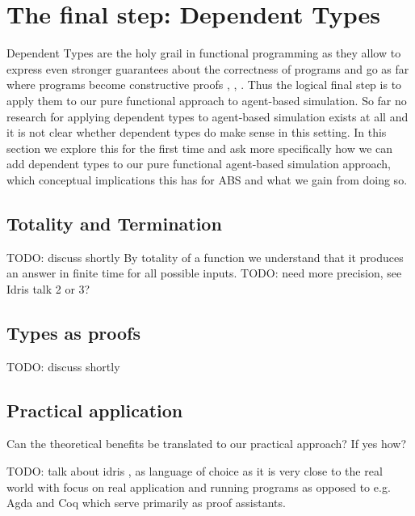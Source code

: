 \section{The final step: Dependent Types}
Dependent Types are the holy grail in functional programming as they allow to express even stronger guarantees about the correctness of programs and go as far where programs become constructive proofs \cite{altenkirch_why_2005}, \cite{altenkirch_pi_sigma:_2010}, \cite{program_homotopy_2013}. Thus the logical final step is to apply them to our pure functional approach to agent-based simulation.
So far no research for applying dependent types to agent-based simulation exists at all and it is not clear whether dependent types do make sense in this setting.
In this section we explore this for the first time and ask more specifically how we can add dependent types to our pure functional agent-based simulation approach, which conceptual implications this has for ABS and what we gain from doing so.

\subsection{Totality and Termination}
TODO: discuss shortly
By totality of a function we understand that it produces an answer in finite time for all possible inputs. TODO: need more precision, see Idris talk 2 or 3?

\subsection{Types as proofs}
TODO: discuss shortly
\cite{wadler_propositions_2015}

\subsection{Practical application}
Can the theoretical benefits be translated to our practical approach? If yes how?

TODO: talk about idris \cite{brady_idris_2013}, \cite{brady_type-driven_2017} as language of choice as it is very close to the real world with focus on real application and running programs as opposed to e.g. Agda and Coq which serve primarily as proof assistants.

